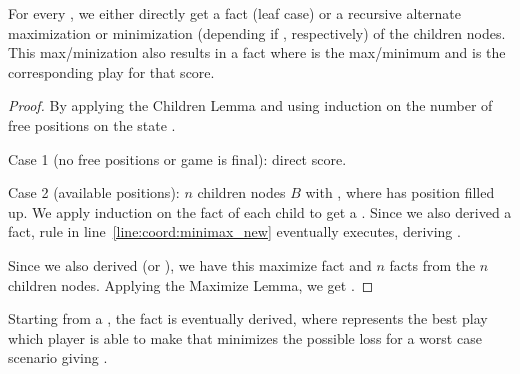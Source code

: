 \begin{theorem}
For every , we either
directly get a  fact (leaf case) or a recursive alternate maximization or
minimization (depending if , respectively) of
the children nodes. This max/minization also results in a  fact where  is the max/minimum and  is the
corresponding play for that score.
\end{theorem}
\begin{proof}
By applying the Children Lemma and using induction on the number of free
positions on the state .

Case 1 (no free positions or game is final): direct score.

Case 2 (available positions): $n$ children nodes $B$ with , where  has position
 filled up. We apply induction on the  fact of each child
 to get a . Since we also derived a
 fact, rule in line~\ref{line:coord:minimax_new} eventually
executes, deriving .

Since we also derived  (or ), we
have this maximize fact and $n$  facts from the $n$ children
nodes. Applying the Maximize Lemma, we get .

\end{proof}

\begin{corollary}[MiniMax]
Starting from a , the fact
 is eventually derived, where  represents the
best play which player  is able to make that minimizes the possible loss for
a worst case scenario giving .
\end{corollary}
\clearpage

